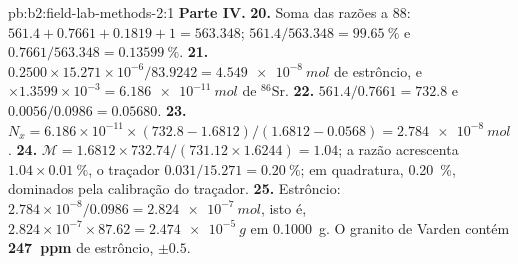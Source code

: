 \begin{solution}{pb:b2:field-lab-methods-2:1}
\noindent\textbf{Parte IV.}
\textbf{20.} Soma das razões a 88: $561.4 + 0.7661 + 0.1819 + 1 = 563.348$; $561.4/563.348 =
\qty{99.65}{\percent}$ e $0.7661/563.348 = \qty{0.13599}{\percent}$.
\textbf{21.} $0.2500 \times 15.271 \times 10^{-6}/83.9242 = \qty{4.549e-8}{mol}$ de estrôncio, e
$\times 1.3599 \times 10^{-3} = \qty{6.186e-11}{mol}$ de $^{86}\mathrm{Sr}$.
\textbf{22.} $561.4/0.7661 = 732.8$ e $0.0056/0.0986 = 0.05680$.
\textbf{23.} $N_x = 6.186 \times 10^{-11} \times (732.8 - 1.6812)/(1.6812 - 0.0568) =
\qty{2.784e-8}{mol}$.
\textbf{24.} $\mathcal M = 1.6812 \times 732.74/(731.12 \times 1.6244) = 1.04$; a razão acrescenta
$1.04 \times \qty{0.01}{\percent}$, o traçador $0.031/15.271 = \qty{0.20}{\percent}$; em quadratura,
\qty{0.20}{\percent}, dominados pela calibração do traçador.
\textbf{25.} Estrôncio: $2.784 \times 10^{-8}/0.0986 = \qty{2.824e-7}{mol}$, isto é, $2.824 \times
10^{-7} \times 87.62 = \qty{2.474e-5}{g}$ em \qty{0.1000}{g}. O granito de Varden contém
\textbf{\qty[text-series-to-math=true]{247}{ppm}} de estrôncio, $\pm 0.5$.
\end{solution}
